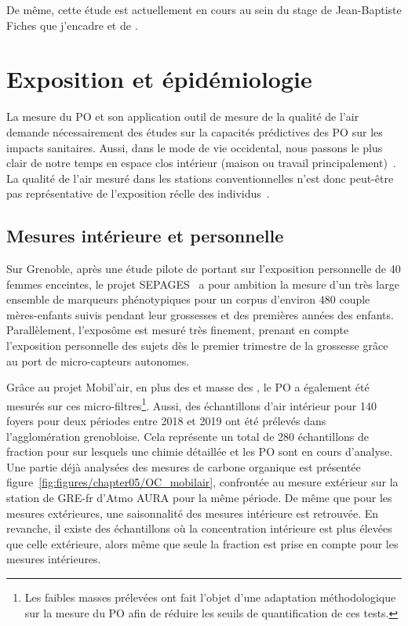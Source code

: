 De même, cette étude est actuellement en cours au sein du stage de Jean-Baptiste Fiches
que j'encadre et de \cite{borlazaUrbaninprep.}.

\section{Exposition et épidémiologie}

La mesure du PO et son application outil de mesure de la qualité de l'air demande
nécessairement des études sur la capacités prédictives des PO sur les impacts sanitaires.
Aussi, dans le mode de vie occidental, nous passons le plus clair de notre temps en espace
clos intérieur (maison ou travail
principalement)~\autocite{netheryTime2009,ouidirEstimation2015}. La qualité de l'air
mesuré dans les stations conventionnelles n'est donc peut-être pas représentative de
l'exposition réelle des individus~\autocite{sauvainOxidative2015}.

\subsection{Mesures intérieure et personnelle}

Sur Grenoble, après une étude pilote de \cite{ouidirEstimation2015} portant sur
l'exposition personnelle de 40 femmes enceintes, le projet
SEPAGES~\autocite{lyon-caenDeciphering2019} a pour ambition la mesure d'un très large
ensemble de marqueurs phénotypiques pour un corpus d'environ 480 couple mères-enfants
suivis pendant leur grossesses et des premières années des enfants. Parallèlement,
l'exposôme est mesuré très finement, prenant en compte l'exposition personnelle des
sujets dès le premier trimestre de la grossesse grâce au port de micro-capteurs autonomes.

Grâce au projet Mobil'air, en plus des  et masse des \PMdc, le PO a également été
mesurés sur ces micro-filtres\footnote{Les faibles masses prélevées ont fait l'objet
    d'une adaptation méthodologique sur la mesure du PO afin de réduire les seuils de
quantification de ces tests.}.
Aussi, des échantillons d'air intérieur pour 140 foyers pour deux périodes entre 2018 et
2019 ont été prélevés dans l'agglomération grenobloise. Cela représente un total de 280
échantillons de fraction \PMdc{} pour sur lesquels une chimie détaillée et les PO sont en
cours d'analyse. Une partie déjà analysées des mesures de carbone organique est présentée
figure~\ref{fig:figures/chapter05/OC_mobilair}, confrontée au mesure extérieur sur la
station de GRE-fr d'Atmo AURA pour la même période. De même que pour les mesures extérieures,
une saisonnalité des mesures intérieure est retrouvée.
En revanche, il existe
des échantillons où la concentration intérieure est plus élevées que celle extérieure,
alors même que seule la fraction \PMdc{} est prise en compte pour les mesures intérieures.

